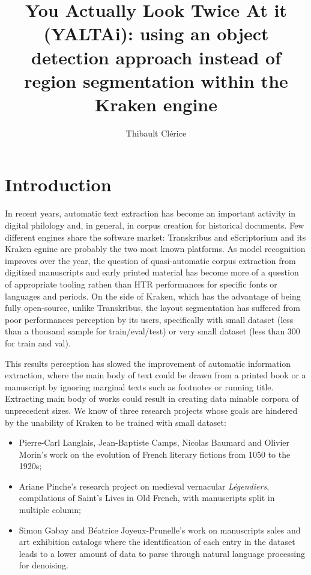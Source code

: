 \documentclass{jdmdh}
\title{You Actually Look Twice At it (YALTAi): using an object detection approach instead of region segmentation within the Kraken engine}
\author[1]{Thibault Clérice}
\affil[1]{Centre Jean-Mabillon, PSL Research University, France}
\affil[2]{Hisoma (UMR 5189), Université Lyon 3, Université de Lyon (UDL), France}
\begin{document}
\maketitle



\section{Introduction}

 
In recent years, automatic text extraction has become an important activity in digital philology and, in general, in corpus creation for historical documents. Few different engines share the software market: Transkribus and eScriptorium and its Kraken egnine are probably the two most known platforms. As model recognition improves over the year, the question of quasi-automatic corpus extraction from digitized manuscripts and early printed material has become more of a question of appropriate tooling rathen than HTR performances for specific fonts or languages and periods. On the side of Kraken, which has the advantage of being fully open-source, unlike Transkribus, the layout segmentation has suffered from poor performances perception by its users, specifically with small dataset (less than a thousand sample for train/eval/test) or very small dataset (less than 300 for train and val). 

This results perception has slowed the improvement of automatic information extraction, where the main body of text could be drawn from a printed book or a manuscript by ignoring marginal texts such as footnotes or running title. Extracting main body of works could result in creating data minable corpora of unprecedent sizes. We know of three research projects whose goals are hindered by the unability of Kraken to be trained with small dataset:

\begin{itemize}
    \item Pierre-Carl Langlais, Jean-Baptiste Camps, Nicolas Baumard and Olivier Morin's work on the evolution of French literary fictions from 1050 to the 1920s;
    \item Ariane Pinche's research project on medieval vernacular \textit{Légendiers}, compilations of Saint's Lives in Old French, with manuscripts split in multiple column;
    \item Simon Gabay and Béatrice Joyeux-Prunelle's work on manuscripts sales and art exhibition catalogs where the identification of each entry in the dataset leads to a lower amount of data to parse through natural language processing for denoising.
\end{itemize}
\end{document}
